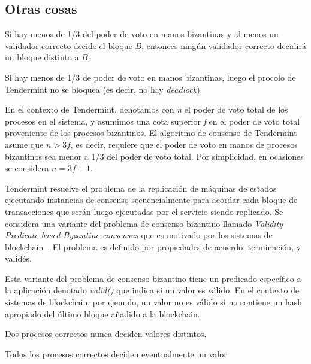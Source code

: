 \subsection{Otras cosas}
\begin{property}[Safety]\label{tendermint:safety}
  Si hay menos de 1/3 del poder de voto en manos bizantinas y al menos un validador correcto
  decide el bloque $B$, entonces ningún validador correcto decidirá un bloque distinto a $B$.
\end{property}

\begin{property}[Liveness]\label{tendermint:liveness}
  Si hay menos de 1/3 de poder de voto en manos bizantinas, luego el procolo de Tendermint
  no se bloquea (es decir, no hay \textit{deadlock}).
\end{property}

En el contexto de Tendermint, denotamos con \textit{n} el poder de voto total de los procesos
en el sistema, y asumimos una cota superior \textit{f} en el poder de voto total proveniente de
los procesos bizantinos.
%
El algoritmo de consenso de Tendermint asume que $n > 3f$, es decir, requiere que el poder de voto
en manos de procesos bizantinos sea menor a 1/3 del poder de voto total.
Por simplicidad, en ocasiones se considera $n = 3f + 1$.

Tendermint resuelve el problema de la replicación de máquinas de estados ejecutando instancias de
consenso secuencialmente para acordar cada bloque de transacciones que serán luego ejecutadas por el
servicio siendo replicado.
Se considera una variante del problema de consenso bizantino llamado \textit{Validity Predicate-based Byzantine consensus}
que es motivado por los sistemas de blockchain~\cite{Crain2017LeaderRandomizationSignaturefreeBC}.
El problema es definido por propiedades de acuerdo, terminación, y validés.

Esta variante del problema de consenso bizantino tiene un predicado específico a la aplicación
denotado \textit{valid()} que indica si un valor es válido. En el contexto de sistemas de blockchain, por ejemplo,
un valor no es válido si no contiene un hash apropiado del último bloque añadido a la blockchain.

\begin{property}[Agreement]\label{tendermint:agreement1}
  Dos procesos correctos nunca deciden valores distintos.
\end{property}

\begin{property}[Termination]\label{tendermint:termination1}
    Todos los procesos correctos deciden eventualmente un valor.
\end{property}

